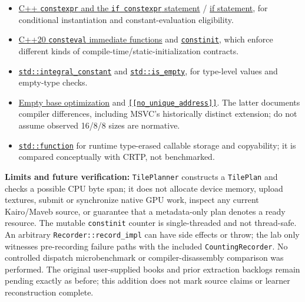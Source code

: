\begin{itemize}
\tightlist
\item
  \href{https://en.cppreference.com/w/cpp/language/constexpr}{C++ \texttt{constexpr} and the \texttt{if\ constexpr} statement} / \href{https://en.cppreference.com/w/cpp/language/if}{if statement}, for conditional instantiation and constant-evaluation eligibility.
\item
  \href{https://en.cppreference.com/w/cpp/language/consteval}{C++20 \texttt{consteval} immediate functions} and \href{https://en.cppreference.com/w/cpp/language/constinit}{\texttt{constinit}}, which enforce different kinds of compile-time/static-initialization contracts.
\item
  \href{https://en.cppreference.com/w/cpp/types/integral_constant}{\texttt{std::integral\_constant}} and \href{https://en.cppreference.com/w/cpp/types/is_empty}{\texttt{std::is\_empty}}, for type-level values and empty-type checks.
\item
  \href{https://en.cppreference.com/w/cpp/language/ebo}{Empty base optimization} and \href{https://en.cppreference.com/w/cpp/language/attributes/no_unique_address}{\texttt{{[}{[}no\_unique\_address{]}{]}}}. The latter documents compiler differences, including MSVC's historically distinct extension; do not assume observed 16/8/8 sizes are normative.
\item
  \href{https://en.cppreference.com/w/cpp/utility/functional/function}{\texttt{std::function}} for runtime type-erased callable storage and copyability; it is compared conceptually with CRTP, not benchmarked.
\end{itemize}

\textbf{Limits and future verification:} \texttt{TilePlanner} constructs a \texttt{TilePlan} and checks a possible CPU byte span; it does not allocate device memory, upload textures, submit or synchronize native GPU work, inspect any current Kairo/Maveb source, or guarantee that a metadata-only plan denotes a ready resource. The mutable \texttt{constinit} counter is single-threaded and not thread-safe. An arbitrary \texttt{Recorder::record\_impl} can have side effects or throw; the lab only witnesses pre-recording failure paths with the included \texttt{CountingRecorder}. No controlled dispatch microbenchmark or compiler-disassembly comparison was performed. The original user-supplied books and prior extraction backlogs remain pending exactly as before; this addition does not mark source claims or learner reconstruction complete.

